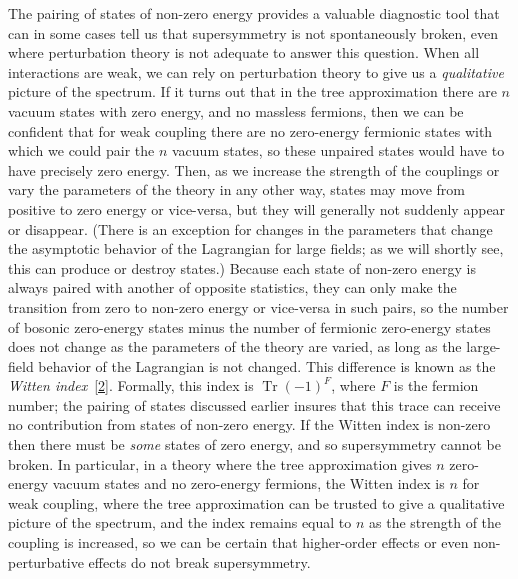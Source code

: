 The pairing of states of non-zero energy provides a valuable diagnostic
tool that can in some cases tell us that supersymmetry is not
spontaneously broken, even where perturbation theory is not adequate to
answer this question. When all interactions are weak, we can rely on
perturbation theory to give us a \emph{qualitative} picture of the
spectrum. If it turns out that in the tree approximation there are \(n\)
vacuum states with zero energy, and no massless fermions, then we can be
confident that for weak coupling there are no zero-energy fermionic states
with which we could pair the \(n\) vacuum states, so these unpaired states
would have to have precisely zero energy. Then, as we increase the
strength of the couplings or vary the parameters of the theory in any
other way, states may move from positive to zero energy or vice-versa, but
they will generally not suddenly appear or disappear. (There is an
exception for changes in the parameters that change the asymptotic
behavior of the Lagrangian for large fields; as we will shortly see, this
can produce or destroy states.) Because each state of non-zero energy is
always paired with another of opposite statistics, they can only make the
transition from zero to non-zero energy or vice-versa in such pairs, so
the number of bosonic zero-energy states minus the number of fermionic
zero-energy states does not change as the parameters of the theory are
varied, as long as the large-field behavior of the Lagrangian is not
changed. This difference is known as the \emph{Witten
index}~\hyperref[ch29-ref-2]{[2]}. Formally, this index is
\(\operatorname{Tr}(-1)^F\), where \(F\) is the fermion number; the
pairing of states discussed earlier insures that this trace can receive
no contribution from states of non-zero energy. If the Witten index is
non-zero then there must be \emph{some} states of zero energy, and so
supersymmetry cannot be broken. In particular, in a theory where the tree
approximation gives \(n\) zero-energy vacuum states and no zero-energy
fermions, the Witten index is \(n\) for weak coupling, where the tree
approximation can be trusted to give a qualitative picture of the
spectrum, and the index remains equal to \(n\) as the strength of the
coupling is increased, so we can be certain that higher-order effects or
even non-perturbative effects do not break supersymmetry.

